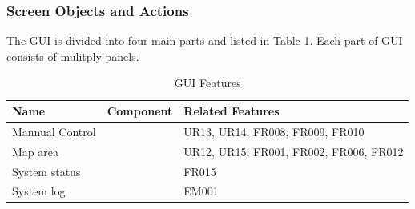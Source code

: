 \subsubsection{Screen Objects and Actions}
The GUI is divided into four main parts and listed in Table 1. Each part of GUI consists of mulitply panels.

\begin{table}[]
	\centering
	\caption{GUI Features}
	\label{GUI Features}
	\begin{tabular}{|l|l|l|}
		\hline
		Name             & Component & Related Features                       \\ \hline
		Mannual Control &           & UR13, UR14, FR008, FR009, FR010        \\ \hline
		Map area         &           & UR12, UR15, FR001, FR002, FR006, FR012 \\ \hline
		System status    &           & FR015                                  \\ \hline
		System log       &           & EM001                                  \\ \hline
	\end{tabular}
\end{table}

